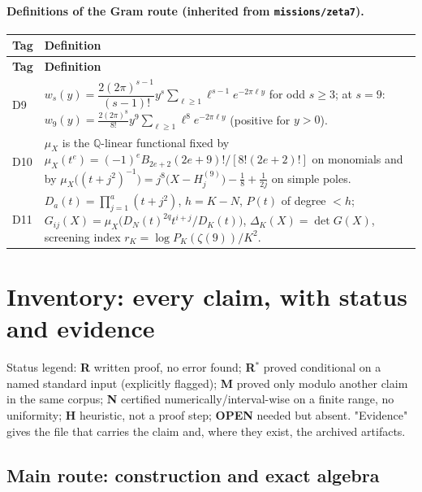 \documentclass[11pt]{article}
\newcommand{\stR}{\textcolor{okgreen}{\textbf{R}}}
\newcommand{\stC}{\textcolor{okgreen}{\textbf{R$^{*}$}}}
\newcommand{\stM}{\textcolor{numblue}{\textbf{M}}}
\newcommand{\stN}{\textcolor{numblue}{\textbf{N}}}
\newcommand{\stH}{\textcolor{heugrey}{\textbf{H}}}
\newcommand{\stO}{\textcolor{gapred}{\textbf{OPEN}}}
\newcommand{\Q}{\mathbb{Q}}
\begin{document}
\paragraph{Definitions of the Gram route (inherited from \texttt{missions/zeta7}).}
\begin{longtable}{@{}p{}p{}@{}}
\toprule \textbf{Tag} & \textbf{Definition} \\ \midrule
\endfirsthead
\toprule \textbf{Tag} & \textbf{Definition} \\ \midrule
\endhead
D9  & $w_s(y)=\dfrac{2(2\pi)^{s-1}}{(s-1)!}y^{s}\sum_{\ell\ge1}\ell^{s-1}e^{-2\pi\ell y}$ for odd $s\ge3$;
       at $s=9$: $w_9(y)=\frac{2(2\pi)^8}{8!}y^{9}\sum_{\ell\ge1}\ell^{8}e^{-2\pi\ell y}$ (positive for $y>0$). \\
D10 & $\mu_X$ is the $\Q$-linear functional fixed by $\mu_X(t^{e})=(-1)^eB_{2e+2}(2e+9)!/[8!(2e+2)!]$
       on monomials and by $\mu_X\bigl((t+j^2)^{-1}\bigr)=j^{8}\bigl(X-H_j^{(9)}\bigr)-\tfrac18+\tfrac1{2j}$
       on simple poles. \\
D11 & $D_a(t)=\prod_{j=1}^{a}(t+j^{2})$, $h=K-N$, $P(t)$ of degree $<h$;
       $G_{ij}(X)=\mu_X\!\bigl(D_N(t)^{2q}t^{i+j}/D_K(t)\bigr)$, $\Delta_K(X)=\det G(X)$,
       screening index $r_K=\log P_K(\zeta(9))/K^{2}$. \\
\bottomrule
\end{longtable}

\section{Inventory: every claim, with status and evidence}
\label{sec:inventory}

Status legend: \stR{} written proof, no error found;
\stC{} proved conditional on a named standard input (explicitly flagged);
\stM{} proved only modulo another claim in the same corpus;
\stN{} certified numerically/interval-wise on a finite range, no uniformity;
\stH{} heuristic, not a proof step; \stO{} needed but absent.
"Evidence" gives the file that carries the claim and, where they exist, the archived artifacts.

\subsection{Main route: construction and exact algebra}
\end{document}
